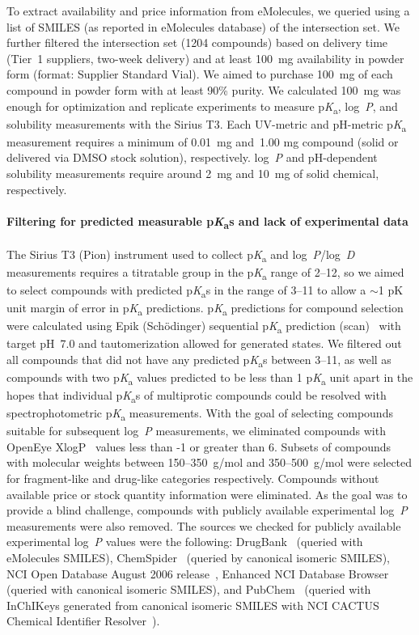 \documentclass[9pt,lineno]{elife}
\newcommand{\pKa}{p\textit{K}\textsubscript{a}}
\newcommand{\logD}{log~\textit{D}}
\newcommand{\logP}{log~\textit{P}}
\begin{document}
To extract availability and price information from eMolecules, we queried using a list of SMILES (as reported in eMolecules database) of the intersection set. 
We further filtered the intersection set (1204 compounds) based on delivery time (Tier~1 suppliers, two-week delivery) and at least 100~mg availability in powder form (format: Supplier Standard Vial).  
We aimed to purchase 100~mg of each compound in powder form with at least 90\% purity. We calculated 100~mg was enough for optimization and replicate experiments to measure \pKa{}, \logP{}, and solubility measurements with the Sirius T3. 
Each UV-metric and pH-metric \pKa{} measurement requires a minimum of 0.01~mg and~1.00 mg compound (solid or delivered via DMSO stock solution), respectively. 
\logP{} and pH-dependent solubility measurements require around 2~mg and 10~mg of solid chemical, respectively. 

\paragraph{Filtering for predicted measurable \pKa{}s and lack of experimental data}

The Sirius T3 (Pion) instrument used to collect \pKa{} and \logP{}/\logD{} measurements requires a titratable group in the \pKa{} range of 2--12, so we aimed to select compounds with predicted \pKa{}s in the range of 3--11 to allow a $\sim$1 pK unit margin of error in \pKa{} predictions. 
\pKa{} predictions for compound selection were calculated using Epik (Sch\"{o}dinger) sequential \pKa{} prediction (scan)~\citep{shelley_epik:_2007,schrodinger_epik_v3_8} with target pH~7.0 and tautomerization allowed for generated states. 
We filtered out all compounds that did not have any predicted \pKa{}s between 3--11, as well as compounds with two \pKa{} values predicted to be less than 1 \pKa{} unit apart in the hopes that individual \pKa{}s of multiprotic compounds could be resolved with spectrophotometric \pKa{} measurements. 
With the goal of selecting compounds suitable for subsequent \logP{} measurements, we eliminated compounds with OpenEye XlogP~\citep{oemolprop_openeye_2017} values less than -1 or greater than 6. 
Subsets of compounds with molecular weights between 150--350~g/mol and 350--500~g/mol were selected for fragment-like and drug-like categories respectively. 
Compounds without available price or stock quantity information were eliminated. 
As the goal was to provide a blind challenge, compounds with publicly available experimental \logP{} measurements were also removed.
The sources we checked for publicly available experimental \logP{} values were the following: DrugBank~\citep{wishart_drugbank:_2006} (queried with eMolecules SMILES), ChemSpider~\citep{pence_chemspider:_2010} (queried by canonical isomeric SMILES), NCI Open Database August 2006 release~\citep{nci_open_database_2006}, Enhanced NCI Database Browser~\citep{nci_database_browser} (queried with canonical isomeric SMILES), and PubChem~\citep{kim_pubchem_2016} (queried with InChIKeys generated from canonical isomeric SMILES with NCI CACTUS Chemical Identifier Resolver~\citep{nci_chem_id_resolver}).
\end{document}
